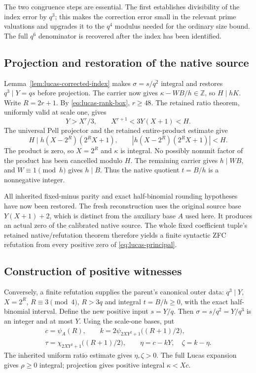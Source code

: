 \documentclass[11pt,letterpaper]{article}
\theoremstyle{definition}
\theoremstyle{remark}
\begin{document}
The two congruence steps are essential.  The first establishes divisibility
of the index error by $q^3$; this makes the correction error small in the
relevant prime valuations and upgrades it to the $q^4$ modulus needed for
the ordinary size bound.  The full $q^6$ denominator is recovered after the
index has been identified.

\subsection{Projection and restoration of the native source}

Lemma~\ref{lem:lucas-corrected-index} makes $\sigma=s/q^2$ integral and
restores $q^3\mid Y=qs$ before projection.  The carrier now gives
$\kappa-WB/h\in\mathbb Z$, so $H\mid hK$.
Write $R=2r+1$.  By \eqref{eq:lucas-rank-box}, $r\ge48$.
The retained ratio theorem, uniformly valid at scale one, gives
\[
 Y>X^r/3,\qquad X^{r+1}<3Y(X+1)<H.
\]
The universal Pell projector and the retained entire-product estimate give
\[
 H\mid h(X-2^R)(2^RX+1),\qquad
 |h(X-2^R)(2^RX+1)|<H.
\]
The product is zero, so $X=2^R$ and $\kappa$ is integral.  No possibly
nonunit factor of the product has been cancelled modulo $H$.  The remaining
carrier gives $h\mid WB$, and $W\equiv1\pmod h$ gives $h\mid B$.
Thus the native quotient $t=B/h$ is a nonnegative integer.

All inherited fixed-minus parity and exact half-binomial rounding hypotheses
have now been restored.  The fresh reconstruction uses the original source
base $Y(X+1)+2$, which is distinct from the auxiliary base $A$ used here.
It produces an actual zero of the calibrated native source.  The whole fixed
coefficient tuple's retained native/refutation theorem therefore yields a
finite syntactic ZFC refutation from every positive zero of
\eqref{eq:lucas-principal}.

\subsection{Construction of positive witnesses}

Conversely, a finite refutation supplies the parent's canonical outer data:
$q^3\mid Y$, $X=2^R$, $R\equiv3\pmod4$, $R>3q$ and integral
$t=B/h\ge0$, with the exact half-binomial interval.  Define the new positive
input $s=Y/q$.  Then $\sigma=s/q^2=Y/q^3$ is an integer and at most $Y$.
Using the scale-one bases, put
\begin{gather*}
 c=\psi_A(R),\qquad
 k=2\psi_{2XY^2+1}\bigl((R+1)/2\bigr),\\
 \tau=\chi_{2XY^2+1}\bigl((R+1)/2\bigr),\qquad
 \eta=c-kY,\quad\zeta=k-\eta.
\end{gather*}
The inherited uniform ratio estimate gives $\eta,\zeta>0$.  The full
Lucas expansion gives $\rho\ge0$ integral; projection gives positive
integral $\kappa<Xc$.
\end{document}

